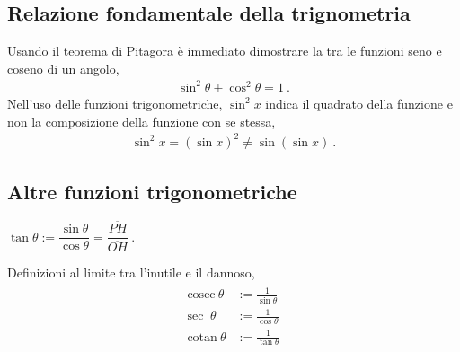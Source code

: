 \documentclass[letterpaper,10pt,italian]{jupyterBook}
\begin{document}
\subsection{Relazione fondamentale della trignometria}
\label{\detokenize{ch/trigonometry:relazione-fondamentale-della-trignometria}}
\sphinxAtStartPar
Usando il teorema di Pitagora è immediato dimostrare la  tra le funzioni seno e coseno di un angolo,
\begin{equation*}
\begin{split}\sin^2 \theta + \cos^2 \theta = 1 \ .\end{split}
\end{equation*}
\sphinxAtStartPar
{} Nell’uso delle funzioni trigonometriche, \(\sin^2 x\) indica il quadrato della funzione e non la composizione della funzione con se stessa,
\begin{equation*}
\begin{split}\sin^2 x = (\sin x)^2 \neq \sin( \sin x) \ .\end{split}
\end{equation*}

\subsection{Altre funzioni trigonometriche}
\label{\detokenize{ch/trigonometry:altre-funzioni-trigonometriche}}
\sphinxAtStartPar
{} \(\tan \theta := \dfrac{\sin \theta}{\cos \theta} = \dfrac{\overline{PH}}{\overline{OH}} \ .\)

\sphinxAtStartPar
{} Definizioni al limite tra l’inutile e il dannoso,
\begin{equation*}
\begin{split}\begin{aligned}
  \text{cosec} \ \theta & := \frac{1}{\sin \theta} \\
  \text{sec  } \ \theta & := \frac{1}{\cos \theta} \\
  \text{cotan} \ \theta & := \frac{1}{\tan \theta} \\
\end{aligned}\end{split}
\end{equation*}
\end{document}
